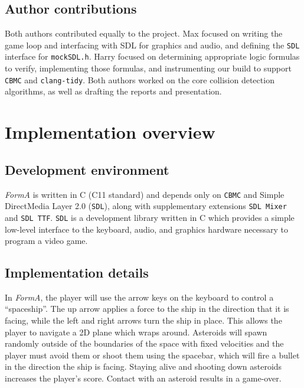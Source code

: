 \documentclass{article}
\newcommand{\Name}{\textit{FormA}\xspace}
\newcommand{\cbmc}{\texttt{CBMC}}
\newcommand{\sdl}{\texttt{SDL}}
\begin{document}
    \subsection{Author contributions}

        Both authors contributed equally to the project. Max focused
        on writing the game loop and interfacing with SDL for graphics and
        audio, and defining the \sdl{} interface for \texttt{mockSDL.h}. Harry
        focused on determining appropriate logic formulas to verify,
        implementing those formulas, and instrumenting our build to support
        \cbmc{} and \texttt{clang-tidy}. Both authors worked on the core
        collision detection algorithms, as well as drafting the reports and
        presentation.

\section{Implementation overview}

    \subsection{Development environment}

        \Name{} is written in C (C11 standard) and depends only on \cbmc{} and
        Simple DirectMedia Layer 2.0 (\sdl{}), along with supplementary
        extensions \texttt{SDL Mixer} and \texttt{SDL TTF}. \sdl{} is a
        development library written in C which provides a simple low-level
        interface to the keyboard, audio, and graphics hardware necessary to
        program a video game.

    \subsection{Implementation details}

        In \Name{}, the player will use the arrow keys on the keyboard to
        control a ``spaceship''. The up arrow applies a force to the ship in the
        direction that it is facing, while the left and right arrows turn the
        ship in place. This allows the player to navigate a 2D plane which wraps
        around. Asteroids will spawn randomly outside of the boundaries of the
        space with fixed velocities and the player must avoid them or shoot them
        using the spacebar, which will fire a bullet in the direction the ship
        is facing. Staying alive and shooting down asteroids increases the
        player's score. Contact with an asteroid results in a game-over.
\end{document}
